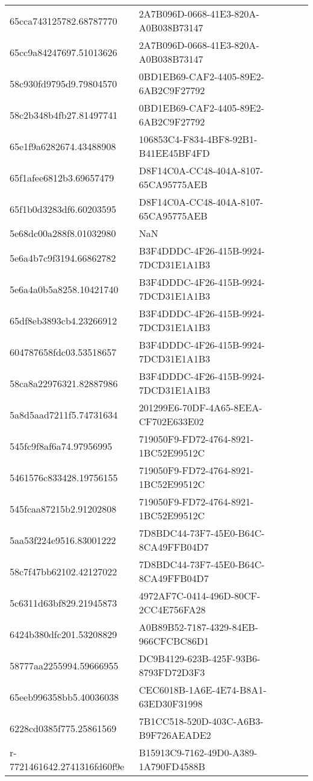 \begin{tabular}{ll}
65cca743125782.68787770 & 2A7B096D-0668-41E3-820A-A0B038B73147 \\
65cc9a84247697.51013626 & 2A7B096D-0668-41E3-820A-A0B038B73147 \\
58c930fd9795d9.79804570 & 0BD1EB69-CAF2-4405-89E2-6AB2C9F27792 \\
58c2b348b4fb27.81497741 & 0BD1EB69-CAF2-4405-89E2-6AB2C9F27792 \\
65e1f9a6282674.43488908 & 106853C4-F834-4BF8-92B1-B41EE45BF4FD \\
65f1afee6812b3.69657479 & D8F14C0A-CC48-404A-8107-65CA95775AEB \\
65f1b0d3283df6.60203595 & D8F14C0A-CC48-404A-8107-65CA95775AEB \\
5e68dc00a288f8.01032980 & NaN \\
5e6a4b7c9f3194.66862782 & B3F4DDDC-4F26-415B-9924-7DCD31E1A1B3 \\
5e6a4a0b5a8258.10421740 & B3F4DDDC-4F26-415B-9924-7DCD31E1A1B3 \\
65df8eb3893cb4.23266912 & B3F4DDDC-4F26-415B-9924-7DCD31E1A1B3 \\
604787658fdc03.53518657 & B3F4DDDC-4F26-415B-9924-7DCD31E1A1B3 \\
58ca8a22976321.82887986 & B3F4DDDC-4F26-415B-9924-7DCD31E1A1B3 \\
5a8d5aad7211f5.74731634 & 201299E6-70DF-4A65-8EEA-CF702E633E02 \\
545fc9f8af6a74.97956995 & 719050F9-FD72-4764-8921-1BC52E99512C \\
5461576c833428.19756155 & 719050F9-FD72-4764-8921-1BC52E99512C \\
545fcaa87215b2.91202808 & 719050F9-FD72-4764-8921-1BC52E99512C \\
5aa53f224e9516.83001222 & 7D8BDC44-73F7-45E0-B64C-8CA49FFB04D7 \\
58c7f47bb62102.42127022 & 7D8BDC44-73F7-45E0-B64C-8CA49FFB04D7 \\
5c6311d63bf829.21945873 & 4972AF7C-0414-496D-80CF-2CC4E756FA28 \\
6424b380dfc201.53208829 & A0B89B52-7187-4329-84EB-966CFCBC86D1 \\
58777aa2255994.59666955 & DC9B4129-623B-425F-93B6-8793FD72D3F3 \\
65eeb996358bb5.40036038 & CEC6018B-1A6E-4E74-B8A1-63ED30F31998 \\
6228cd0385f775.25861569 & 7B1CC518-520D-403C-A6B3-B9F726AEADE2 \\
r-7721461642.2741316fd60f9e & B15913C9-7162-49D0-A389-1A790FD4588B \\

\end{tabular}
